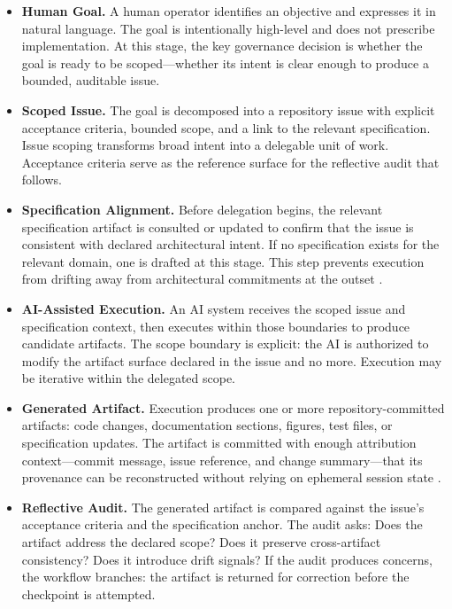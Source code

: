 \begin{itemize}
  \item \textbf{Human Goal.} A human operator identifies an objective and expresses it in natural language. The goal is intentionally high-level and does not prescribe implementation. At this stage, the key governance decision is whether the goal is ready to be scoped---whether its intent is clear enough to produce a bounded, auditable issue.

  \item \textbf{Scoped Issue.} The goal is decomposed into a repository issue with explicit acceptance criteria, bounded scope, and a link to the relevant specification. Issue scoping transforms broad intent into a delegable unit of work. Acceptance criteria serve as the reference surface for the reflective audit that follows.

  \item \textbf{Specification Alignment.} Before delegation begins, the relevant specification artifact is consulted or updated to confirm that the issue is consistent with declared architectural intent. If no specification exists for the relevant domain, one is drafted at this stage. This step prevents execution from drifting away from architectural commitments at the outset \cite{Parnas1972Modularization}.

  \item \textbf{AI-Assisted Execution.} An AI system receives the scoped issue and specification context, then executes within those boundaries to produce candidate artifacts. The scope boundary is explicit: the AI is authorized to modify the artifact surface declared in the issue and no more. Execution may be iterative within the delegated scope.

  \item \textbf{Generated Artifact.} Execution produces one or more repository-committed artifacts: code changes, documentation sections, figures, test files, or specification updates. The artifact is committed with enough attribution context---commit message, issue reference, and change summary---that its provenance can be reconstructed without relying on ephemeral session state \cite{Lamport1978TimeClocks}.

  \item \textbf{Reflective Audit.} The generated artifact is compared against the issue's acceptance criteria and the specification anchor. The audit asks: Does the artifact address the declared scope? Does it preserve cross-artifact consistency? Does it introduce drift signals? If the audit produces concerns, the workflow branches: the artifact is returned for correction before the checkpoint is attempted.


\end{itemize}
